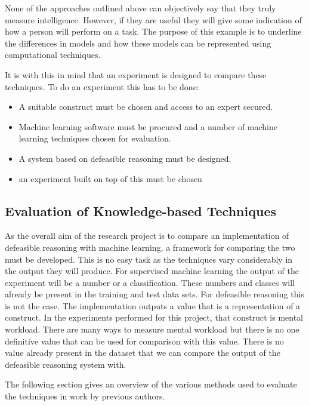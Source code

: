 None of the approaches outlined above can objectively say that they truly measure intelligence. However, if they are useful they will give some indication of how a person will perform on a task. The purpose of this example is to underline the differences in models and how these models can be represented using computational techniques.

It is with this in mind that an experiment is designed to compare these techniques. To do an experiment this has to be done:

\begin{itemize}

  \item A suitable construct must be chosen and access to an expert secured.
  \item Machine learning software must be procured and a number of machine learning techniques chosen for evaluation.
  \item A system based on defeasible reasoning must be designed.
  \item an experiment built on top of this must be chosen 
  
\end{itemize}

\subsection{Evaluation of Knowledge-based Techniques}
\label{sec:evaluation}
As the overall aim of the research project is to compare an implementation of defeasible reasoning with machine learning, a framework for comparing the two must be developed. This is no easy task as the techniques vary considerably in the output they will produce. For supervised machine learning the output of the experiment will be a number or a classification. These numbers and classes will already be present in the training and test data sets. For defeasible reasoning this is not the case. The implementation outputs a value that is a representation of a construct. In the experiments performed for this project, that construct is mental workload. There are many ways to measure mental workload but there is no one definitive value that can be used for comparison with this value. There is no value already present in the dataset that we can compare the output of the defeasible reasoning system with.

The following section gives an overview of the various methods used to evaluate the techniques in work by previous authors.

